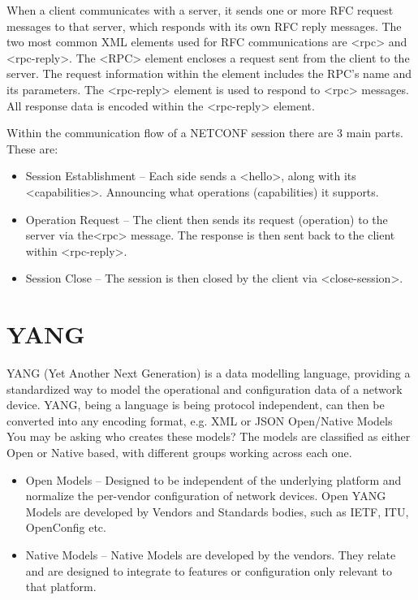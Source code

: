 When a client communicates with a server, it sends one or more RFC request messages to that server, which responds with its own RFC reply messages. The two most common XML elements used for RFC communications are <rpc> and <rpc-reply>. The <RPC> element encloses a request sent from the client to the server. The request information within the element includes the RPC's name and its parameters. The <rpc-reply> element is used to respond to <rpc> messages. All response data is encoded within the <rpc-reply> element.


Within the communication flow of a NETCONF session there are 3 main parts. These are:
\begin{itemize}
    \item Session Establishment – Each side sends a <hello>, along with its <capabilities>. Announcing what operations (capabilities) it supports.
    \item Operation Request – The client then sends its request (operation) to the server via the<rpc> message. The response is then sent back to the client within <rpc-reply>.
    \item Session Close – The session is then closed by the client via <close-session>.
\end{itemize}

\section{YANG}

YANG (Yet Another Next Generation) is a data modelling language, providing a standardized way to model the operational and configuration data of a network device. YANG, being a language is being protocol independent, can then be converted into any encoding format, e.g. XML or JSON
Open/Native Models
You may be asking who creates these models? The models are classified as either Open or Native based, with different groups working across each one.
\begin{itemize}
    \item Open Models – Designed to be independent of the underlying platform and normalize the per-vendor configuration of network devices. Open YANG Models are developed by Vendors and Standards bodies, such as IETF, ITU, OpenConfig etc.
    \item Native Models – Native Models are developed by the vendors. They relate and are designed to integrate to features or configuration only relevant to that platform.
\end{itemize}

